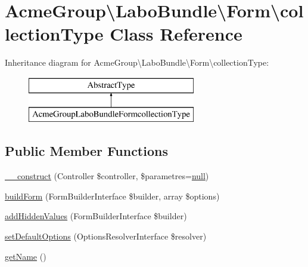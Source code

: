 \hypertarget{class_acme_group_1_1_labo_bundle_1_1_form_1_1collection_type}{\section{Acme\+Group\textbackslash{}Labo\+Bundle\textbackslash{}Form\textbackslash{}collection\+Type Class Reference}
\label{class_acme_group_1_1_labo_bundle_1_1_form_1_1collection_type}
}
Inheritance diagram for Acme\+Group\textbackslash{}Labo\+Bundle\textbackslash{}Form\textbackslash{}collection\+Type\+:\begin{figure}[H]
\begin{center}
\leavevmode
\includegraphics[height=2.000000cm]{class_acme_group_1_1_labo_bundle_1_1_form_1_1collection_type}
\end{center}
\end{figure}
\subsection*{Public Member Functions}
\begin{DoxyCompactItemize}
\item 
\hyperlink{class_acme_group_1_1_labo_bundle_1_1_form_1_1collection_type_aba8322e4b9bb83117818dda06f09a487}{\+\_\+\+\_\+construct} (Controller \$controller, \$parametres=\hyperlink{validate_8js_afb8e110345c45e74478894341ab6b28e}{null})
\item 
\hyperlink{class_acme_group_1_1_labo_bundle_1_1_form_1_1collection_type_a155abcb62d8ccff9db1021e9a8094f67}{build\+Form} (Form\+Builder\+Interface \$builder, array \$options)
\item 
\hyperlink{class_acme_group_1_1_labo_bundle_1_1_form_1_1collection_type_a3e8f3082b977566323b538bb498b18bb}{add\+Hidden\+Values} (Form\+Builder\+Interface \$builder)
\item 
\hyperlink{class_acme_group_1_1_labo_bundle_1_1_form_1_1collection_type_ae5b03ca3699b91f71d22e9c8278a8854}{set\+Default\+Options} (Options\+Resolver\+Interface \$resolver)
\item 
\hyperlink{class_acme_group_1_1_labo_bundle_1_1_form_1_1collection_type_a93cd1eee0388883bcc0ac9d7f8dacbb2}{get\+Name} ()
\end{DoxyCompactItemize}


